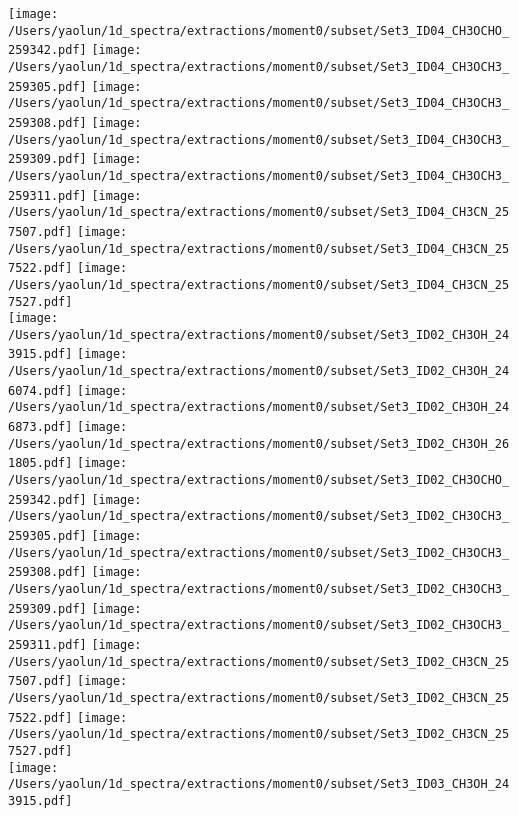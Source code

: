 \begin{figure*}[htbp!]
  \texttt{[image: /Users/yaolun/1d\_spectra/extractions/moment0/subset/Set3\_ID04\_CH3OCHO\_259342.pdf]}
  \texttt{[image: /Users/yaolun/1d\_spectra/extractions/moment0/subset/Set3\_ID04\_CH3OCH3\_259305.pdf]}
  \texttt{[image: /Users/yaolun/1d\_spectra/extractions/moment0/subset/Set3\_ID04\_CH3OCH3\_259308.pdf]}
  \texttt{[image: /Users/yaolun/1d\_spectra/extractions/moment0/subset/Set3\_ID04\_CH3OCH3\_259309.pdf]}
  \texttt{[image: /Users/yaolun/1d\_spectra/extractions/moment0/subset/Set3\_ID04\_CH3OCH3\_259311.pdf]}
  \texttt{[image: /Users/yaolun/1d\_spectra/extractions/moment0/subset/Set3\_ID04\_CH3CN\_257507.pdf]}
  \texttt{[image: /Users/yaolun/1d\_spectra/extractions/moment0/subset/Set3\_ID04\_CH3CN\_257522.pdf]}
  \texttt{[image: /Users/yaolun/1d\_spectra/extractions/moment0/subset/Set3\_ID04\_CH3CN\_257527.pdf]}
  \\
  \texttt{[image: /Users/yaolun/1d\_spectra/extractions/moment0/subset/Set3\_ID02\_CH3OH\_243915.pdf]}
  \texttt{[image: /Users/yaolun/1d\_spectra/extractions/moment0/subset/Set3\_ID02\_CH3OH\_246074.pdf]}
  \texttt{[image: /Users/yaolun/1d\_spectra/extractions/moment0/subset/Set3\_ID02\_CH3OH\_246873.pdf]}
  \texttt{[image: /Users/yaolun/1d\_spectra/extractions/moment0/subset/Set3\_ID02\_CH3OH\_261805.pdf]}
  \texttt{[image: /Users/yaolun/1d\_spectra/extractions/moment0/subset/Set3\_ID02\_CH3OCHO\_259342.pdf]}
  \texttt{[image: /Users/yaolun/1d\_spectra/extractions/moment0/subset/Set3\_ID02\_CH3OCH3\_259305.pdf]}
  \texttt{[image: /Users/yaolun/1d\_spectra/extractions/moment0/subset/Set3\_ID02\_CH3OCH3\_259308.pdf]}
  \texttt{[image: /Users/yaolun/1d\_spectra/extractions/moment0/subset/Set3\_ID02\_CH3OCH3\_259309.pdf]}
  \texttt{[image: /Users/yaolun/1d\_spectra/extractions/moment0/subset/Set3\_ID02\_CH3OCH3\_259311.pdf]}
  \texttt{[image: /Users/yaolun/1d\_spectra/extractions/moment0/subset/Set3\_ID02\_CH3CN\_257507.pdf]}
  \texttt{[image: /Users/yaolun/1d\_spectra/extractions/moment0/subset/Set3\_ID02\_CH3CN\_257522.pdf]}
  \texttt{[image: /Users/yaolun/1d\_spectra/extractions/moment0/subset/Set3\_ID02\_CH3CN\_257527.pdf]}
  \\
  \texttt{[image: /Users/yaolun/1d\_spectra/extractions/moment0/subset/Set3\_ID03\_CH3OH\_243915.pdf]}

\end{figure*}
